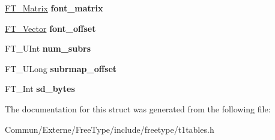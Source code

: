 \begin{DoxyCompactItemize}
\item 
\hyperlink{struct_f_t___matrix__}{F\+T\+\_\+\+Matrix} {\bfseries font\+\_\+matrix}\hypertarget{struct_c_i_d___face_dict_rec___aa418f6ce40b7574b6234e0ab48377e4b}{}\label{struct_c_i_d___face_dict_rec___aa418f6ce40b7574b6234e0ab48377e4b}

\item 
\hyperlink{struct_f_t___vector__}{F\+T\+\_\+\+Vector} {\bfseries font\+\_\+offset}\hypertarget{struct_c_i_d___face_dict_rec___aa62daa8d45ed4a817f1207cbd452d61e}{}\label{struct_c_i_d___face_dict_rec___aa62daa8d45ed4a817f1207cbd452d61e}

\item 
F\+T\+\_\+\+U\+Int {\bfseries num\+\_\+subrs}\hypertarget{struct_c_i_d___face_dict_rec___a611c406c8d7cd2e37d077070f4bb3ebe}{}\label{struct_c_i_d___face_dict_rec___a611c406c8d7cd2e37d077070f4bb3ebe}

\item 
F\+T\+\_\+\+U\+Long {\bfseries subrmap\+\_\+offset}\hypertarget{struct_c_i_d___face_dict_rec___a45d58111727af70018289e7c5b64ba8c}{}\label{struct_c_i_d___face_dict_rec___a45d58111727af70018289e7c5b64ba8c}

\item 
F\+T\+\_\+\+Int {\bfseries sd\+\_\+bytes}\hypertarget{struct_c_i_d___face_dict_rec___aecdf98f9671f22c1715ec929b77767ce}{}\label{struct_c_i_d___face_dict_rec___aecdf98f9671f22c1715ec929b77767ce}

\end{DoxyCompactItemize}


The documentation for this struct was generated from the following file\+:\begin{DoxyCompactItemize}
\item 
Commun/\+Externe/\+Free\+Type/include/freetype/t1tables.\+h\end{DoxyCompactItemize}

